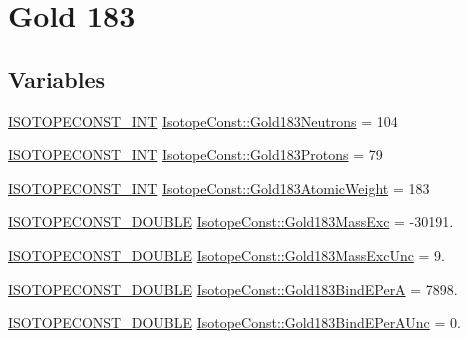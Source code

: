 \hypertarget{group___isotope_const-_gold-_au183}{}\section{Gold 183}
\label{group___isotope_const-_gold-_au183}
\subsection*{Variables}
\begin{DoxyCompactItemize}
\item 
\mbox{\hyperlink{group___isotope_const-_macros_ga5f18360b3e99483a35c32d789e62621c}{I\+S\+O\+T\+O\+P\+E\+C\+O\+N\+S\+T\+\_\+\+I\+NT}} \mbox{\hyperlink{group___isotope_const-_gold-_au183_ga0d7b8275c2d70af2731689e1919b9d03}{Isotope\+Const\+::\+Gold183\+Neutrons}} = 104
\item 
\mbox{\hyperlink{group___isotope_const-_macros_ga5f18360b3e99483a35c32d789e62621c}{I\+S\+O\+T\+O\+P\+E\+C\+O\+N\+S\+T\+\_\+\+I\+NT}} \mbox{\hyperlink{group___isotope_const-_gold-_au183_ga5b6c4060519dc2b10f4b7cbf5e67cd30}{Isotope\+Const\+::\+Gold183\+Protons}} = 79
\item 
\mbox{\hyperlink{group___isotope_const-_macros_ga5f18360b3e99483a35c32d789e62621c}{I\+S\+O\+T\+O\+P\+E\+C\+O\+N\+S\+T\+\_\+\+I\+NT}} \mbox{\hyperlink{group___isotope_const-_gold-_au183_ga7fdf04e3310adb8005844b87ec6e594e}{Isotope\+Const\+::\+Gold183\+Atomic\+Weight}} = 183
\item 
\mbox{\hyperlink{group___isotope_const-_macros_ga8f45a7272ce02c0b4c65c44636ed719a}{I\+S\+O\+T\+O\+P\+E\+C\+O\+N\+S\+T\+\_\+\+D\+O\+U\+B\+LE}} \mbox{\hyperlink{group___isotope_const-_gold-_au183_ga0c862455276625ee82846d44f1081795}{Isotope\+Const\+::\+Gold183\+Mass\+Exc}} = -\/30191.
\item 
\mbox{\hyperlink{group___isotope_const-_macros_ga8f45a7272ce02c0b4c65c44636ed719a}{I\+S\+O\+T\+O\+P\+E\+C\+O\+N\+S\+T\+\_\+\+D\+O\+U\+B\+LE}} \mbox{\hyperlink{group___isotope_const-_gold-_au183_gaf44fe14a9c082f235937bc723d682f67}{Isotope\+Const\+::\+Gold183\+Mass\+Exc\+Unc}} = 9.
\item 
\mbox{\hyperlink{group___isotope_const-_macros_ga8f45a7272ce02c0b4c65c44636ed719a}{I\+S\+O\+T\+O\+P\+E\+C\+O\+N\+S\+T\+\_\+\+D\+O\+U\+B\+LE}} \mbox{\hyperlink{group___isotope_const-_gold-_au183_ga77549f7de437ba5a245b3c1a3a5368fb}{Isotope\+Const\+::\+Gold183\+Bind\+E\+PerA}} = 7898.
\item 
\mbox{\hyperlink{group___isotope_const-_macros_ga8f45a7272ce02c0b4c65c44636ed719a}{I\+S\+O\+T\+O\+P\+E\+C\+O\+N\+S\+T\+\_\+\+D\+O\+U\+B\+LE}} \mbox{\hyperlink{group___isotope_const-_gold-_au183_ga521edf03c642939a317a57560cd93bfd}{Isotope\+Const\+::\+Gold183\+Bind\+E\+Per\+A\+Unc}} = 0.

\end{DoxyCompactItemize}
